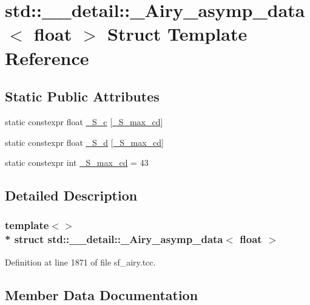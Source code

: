 \hypertarget{structstd_1_1____detail_1_1__Airy__asymp__data_3_01float_01_4}{}\section{std\+:\+:\+\_\+\+\_\+detail\+:\+:\+\_\+\+Airy\+\_\+asymp\+\_\+data$<$ float $>$ Struct Template Reference}
\label{structstd_1_1____detail_1_1__Airy__asymp__data_3_01float_01_4}
\subsection*{Static Public Attributes}
\begin{DoxyCompactItemize}
\item 
static constexpr float \hyperlink{structstd_1_1____detail_1_1__Airy__asymp__data_3_01float_01_4_a8fc68acdbcbc59f4ecfdd4bc2f4f2a1e}{\+\_\+\+S\+\_\+c} \mbox{[}\hyperlink{structstd_1_1____detail_1_1__Airy__asymp__data_3_01float_01_4_ac0e59b83a90623587f20cdc32a9e7565}{\+\_\+\+S\+\_\+max\+\_\+cd}\mbox{]}
\item 
static constexpr float \hyperlink{structstd_1_1____detail_1_1__Airy__asymp__data_3_01float_01_4_ad947443d5860fcd25d25ad6d04ea3bb3}{\+\_\+\+S\+\_\+d} \mbox{[}\hyperlink{structstd_1_1____detail_1_1__Airy__asymp__data_3_01float_01_4_ac0e59b83a90623587f20cdc32a9e7565}{\+\_\+\+S\+\_\+max\+\_\+cd}\mbox{]}
\item 
static constexpr int \hyperlink{structstd_1_1____detail_1_1__Airy__asymp__data_3_01float_01_4_ac0e59b83a90623587f20cdc32a9e7565}{\+\_\+\+S\+\_\+max\+\_\+cd} = 43
\end{DoxyCompactItemize}


\subsection{Detailed Description}
\subsubsection*{template$<$$>$\\*
struct std\+::\+\_\+\+\_\+detail\+::\+\_\+\+Airy\+\_\+asymp\+\_\+data$<$ float $>$}



Definition at line 1871 of file sf\+\_\+airy.\+tcc.



\subsection{Member Data Documentation}
